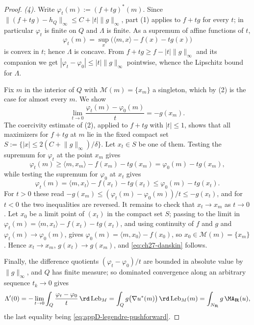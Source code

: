 \begin{proof}
\emph{(4).}  Write $\varphi_t(m):=(f+tg)^*(m)$.  Since
$\lVert(f+tg)-h_Q\rVert_\infty\leq C+|t|\lVert g\rVert_\infty$, part (1)
applies to $f+tg$ for every $t$; in particular $\varphi_t$ is finite on
$Q$ and $\Lambda$ is finite.  As a supremum of affine functions of
$t$,
\[
 \varphi_t(m)=\sup_x\bigl(\langle m,x\rangle-f(x)-tg(x)\bigr)
\]
is convex in $t$; hence $\Lambda$ is concave.  From
$f+tg\geq f-|t|\lVert g\rVert_\infty$ and its companion we get
$|\varphi_t-\varphi_0|\leq|t|\lVert g\rVert_\infty$ pointwise, whence the
Lipschitz bound for $\Lambda$.

Fix $m$ in the interior of $Q$ with $\mathcal M(m)=\{x_m\}$ a
singleton, which by (2) is the case for almost every $m$.  We show
\begin{equation}\label{eq:ch27-danskin}
 \lim_{t\to0}\frac{\varphi_t(m)-\varphi_0(m)}{t}=-g(x_m).
\end{equation}
The coercivity estimate of (2), applied to $f+tg$ with
$|t|\leq1$, shows that all maximizers for $f+tg$ at $m$ lie in the
fixed compact set
$S:=\{|x|\leq2(C+\lVert g\rVert_\infty)/\delta\}$.  Let $x_t\in S$ be
one of them.  Testing the supremum for $\varphi_t$ at the point $x_m$
gives
\[
 \varphi_t(m)\geq\langle m,x_m\rangle-f(x_m)-tg(x_m)
 =\varphi_0(m)-tg(x_m),
\]
while testing the supremum for $\varphi_0$ at $x_t$ gives
\[
 \varphi_t(m)=\langle m,x_t\rangle-f(x_t)-tg(x_t)
 \leq\varphi_0(m)-tg(x_t).
\]
For $t>0$ these read
$-g(x_m)\leq(\varphi_t(m)-\varphi_0(m))/t\leq-g(x_t)$, and for $t<0$ the
two inequalities are reversed.  It remains to check that $x_t\to x_m$ as
$t\to0$.  Let $x_0$ be a limit point of $(x_t)$ in the compact set
$S$; passing to the limit in
$\varphi_t(m)=\langle m,x_t\rangle-f(x_t)-tg(x_t)$, and using continuity
of $f$ and $g$ and $\varphi_t(m)\to\varphi_0(m)$, gives
$\varphi_0(m)=\langle m,x_0\rangle-f(x_0)$, so $x_0\in\mathcal M(m)=
\{x_m\}$.  Hence $x_t\to x_m$, $g(x_t)\to g(x_m)$, and
\eqref{eq:ch27-danskin} follows.

Finally, the difference quotients
$(\varphi_t-\varphi_0)/t$ are bounded in absolute value by
$\lVert g\rVert_\infty$, and $Q$ has finite measure; so dominated
convergence along an arbitrary sequence $t_k\to0$ gives
\[
 \Lambda'(0)
 =-\lim_{t\to0}\int_Q\frac{\varphi_t-\varphi_0}{t}\,
       \rd\operatorname{Leb}_M
 =\int_Qg\bigl(\nabla u^*(m)\bigr)\,\rd\operatorname{Leb}_M(m)
 =\int_{N_{\mathbf R}}g\,\MA_{\mathbf R}(u),
\]
the last equality being \eqref{eq:appD-legendre-pushforward}.
\end{proof}

